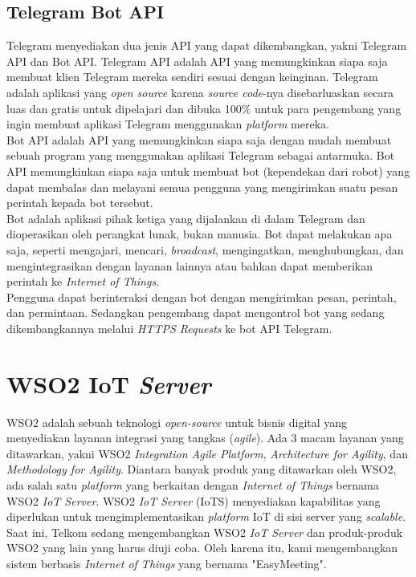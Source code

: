 \subsection{Telegram Bot API}
\tab Telegram menyediakan dua jenis API yang dapat dikembangkan, yakni  Telegram API dan Bot API. Telegram API adalah API yang memungkinkan siapa saja membuat klien Telegram mereka sendiri sesuai dengan keinginan. Telegram adalah aplikasi yang \textit{open source} karena \textit{source code}-nya disebarluaskan secara luas dan gratis untuk dipelajari dan dibuka 100\% untuk para pengembang yang ingin membuat aplikasi Telegram menggunakan \textit{platform} mereka. \\
\tab Bot API adalah API yang memungkinkan siapa saja dengan mudah membuat sebuah program yang menggunakan aplikasi Telegram sebagai antarmuka. Bot API memungkinkan siapa saja untuk membuat bot (kependekan dari robot) yang dapat membalas dan melayani semua pengguna yang mengirimkan suatu pesan perintah kepada bot tersebut. \\
\tab Bot adalah aplikasi pihak ketiga yang dijalankan di dalam Telegram dan dioperasikan oleh perangkat lunak, bukan manusia. Bot dapat melakukan apa saja, seperti mengajari, mencari, \textit{broadcast}, mengingatkan, menghubungkan, dan mengintegrasikan dengan layanan lainnya atau bahkan dapat memberikan perintah ke \textit{Internet of Things}.\\
\tab Pengguna dapat berinteraksi dengan bot dengan mengirimkan pesan, perintah, dan permintaan. Sedangkan pengembang dapat mengontrol bot yang sedang dikembangkannya melalui \textit{HTTPS Requests} ke bot API Telegram.

\section{WSO2 IoT \textit{Server}}
\tab WSO2 adalah sebuah teknologi \textit{open-source} untuk bisnis digital yang menyediakan layanan integrasi yang tangkas (\textit{agile}). Ada 3 macam layanan yang ditawarkan, yakni WSO2 \textit{Integration Agile Platform}, \textit{Architecture for Agility}, dan \textit{Methodology for Agility}. Diantara banyak produk yang ditawarkan oleh WSO2, ada salah satu \textit{platform} yang berkaitan dengan \textit{Internet of Things} bernama WSO2 \textit{IoT Server}. WSO2 \textit{IoT Server} (IoTS) menyediakan kapabilitas yang diperlukan untuk mengimplementasikan \textit{platform} IoT di sisi server yang \textit{scalable}.\\
\tab Saat ini, Telkom sedang mengembangkan WSO2 \textit{IoT Server} dan produk-produk WSO2 yang lain yang harus diuji coba. Oleh karena itu, kami mengembangkan sistem berbasis \textit{Internet of Things} yang bernama "EasyMeeting".

\cleardoublepage